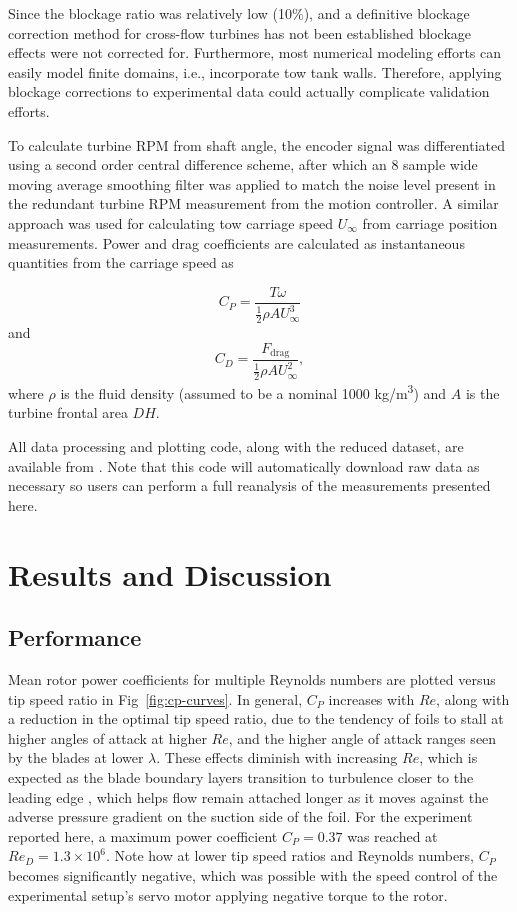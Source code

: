 \documentclass[10pt,letterpaper]{article}
\begin{document}
Since the blockage ratio was relatively low (10\%), and a definitive blockage
correction method for cross-flow turbines has not been established
\cite{Cavagnaro2014} blockage effects were not corrected for. Furthermore, most
numerical modeling efforts can easily model finite domains, i.e., incorporate
tow tank walls. Therefore, applying blockage corrections to experimental data
could actually complicate validation efforts.

To calculate turbine RPM from shaft angle, the encoder signal was differentiated
using a second order central difference scheme, after which an 8 sample wide
moving average smoothing filter was applied to match the noise level present in
the redundant turbine RPM measurement from the motion controller. A similar
approach was used for calculating tow carriage speed $U_\infty$ from carriage
position measurements. Power and drag coefficients are calculated as
instantaneous quantities from the carriage speed as

\begin{equation}
    C_P = \frac{T \omega}{\frac{1}{2} \rho A U_\infty^3}
\end{equation}
and
\begin{equation}
    C_D = \frac{F_\mathrm{drag}}{\frac{1}{2} \rho A U_\infty^2},
\end{equation}
where $\rho$ is the fluid density (assumed to be a nominal 1000
kg/m\textsuperscript{3}) and $A$ is the turbine frontal area $DH$.

All data processing and plotting code, along with the reduced dataset, are
available from \cite{Bachant2016-RM2-data}. Note that this code will
automatically download raw data as necessary so users can perform a full
reanalysis of the measurements presented here.


\section*{Results and Discussion}

\subsection*{Performance}

Mean rotor power coefficients for multiple Reynolds numbers are plotted versus
tip speed ratio in Fig~\ref{fig:cp-curves}. In general, $C_P$ increases with
$Re$, along with a reduction in the optimal tip speed ratio, due to the tendency
of foils to stall at higher angles of attack at higher $Re$, and the higher
angle of attack ranges seen by the blades at lower $\lambda$. These effects
diminish with increasing $Re$, which is expected as the blade boundary layers
transition to turbulence closer to the leading edge \cite{Lissaman1983,
    McMasters1980, Bachant2016-RVAT-Re-dep}, which helps flow remain attached longer
as it moves against the adverse pressure gradient on the suction side of the
foil. For the experiment reported here, a maximum power coefficient $C_P=0.37$
was reached at $Re_D=1.3 \times 10^6$. Note how at lower tip speed ratios and
Reynolds numbers, $C_P$ becomes significantly negative, which was possible with
the speed control of the experimental setup's servo motor applying negative
torque to the rotor.
\end{document}
